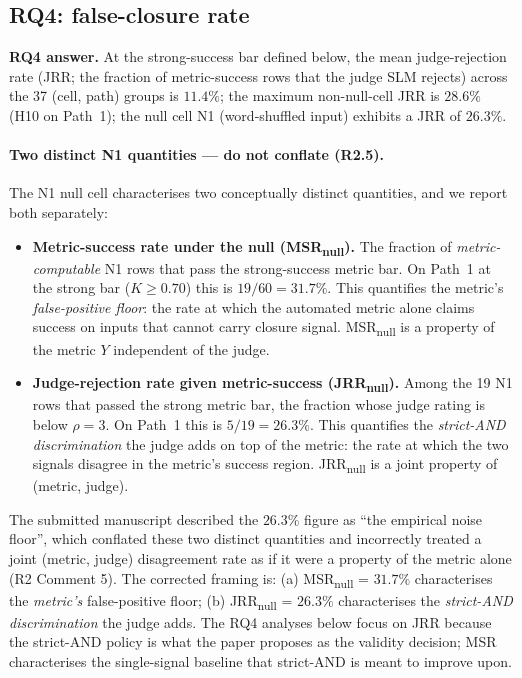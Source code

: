 \subsection{RQ4: false-closure rate}
\label{sec:discussion_rq4}

\textbf{RQ4 answer.} At the strong-success bar defined below, the mean judge-rejection rate (JRR; the fraction of metric-success rows that the judge SLM rejects) across the 37 (cell, path) groups is $11.4\%$; the maximum non-null-cell JRR is $28.6\%$ (H10 on Path~1); the null cell N1 (word-shuffled input) exhibits a JRR of $26.3\%$.



\paragraph{Two distinct N1 quantities --- do not conflate (R2.5).} The N1 null cell characterises two conceptually distinct quantities, and we report both separately:

\begin{itemize}
  \item \textbf{Metric-success rate under the null (MSR\textsubscript{null}).} The fraction of \emph{metric-computable} N1 rows that pass the strong-success metric bar. On Path~1 at the strong bar ($K \geq 0.70$) this is $19/60 = 31.7\%$. This quantifies the metric's \emph{false-positive floor}: the rate at which the automated metric alone claims success on inputs that cannot carry closure signal. MSR\textsubscript{null} is a property of the metric $Y$ independent of the judge.
  \item \textbf{Judge-rejection rate given metric-success (JRR\textsubscript{null}).} Among the 19 N1 rows that passed the strong metric bar, the fraction whose judge rating is below $\rho = 3$. On Path~1 this is $5/19 = 26.3\%$. This quantifies the \emph{strict-AND discrimination} the judge adds on top of the metric: the rate at which the two signals disagree in the metric's success region. JRR\textsubscript{null} is a joint property of (metric, judge).
\end{itemize}

The submitted manuscript described the $26.3\%$ figure as ``the empirical noise floor'', which conflated these two distinct quantities and incorrectly treated a joint (metric, judge) disagreement rate as if it were a property of the metric alone (R2 Comment 5). The corrected framing is: (a) MSR\textsubscript{null} = $31.7\%$ characterises the \emph{metric's} false-positive floor; (b) JRR\textsubscript{null} = $26.3\%$ characterises the \emph{strict-AND discrimination} the judge adds. The RQ4 analyses below focus on JRR because the strict-AND policy is what the paper proposes as the validity decision; MSR characterises the single-signal baseline that strict-AND is meant to improve upon.

